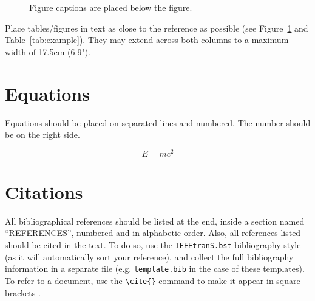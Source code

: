 \documentclass[twoside,10pt]{article}
\begin{document}
\begin{figure}[htbp]
\centerline{}
\caption{Figure captions are placed below the figure.}
\label{fig:example}
\end{figure}
Place tables/figures in text as close to the reference as possible
(see Figure~\ref{fig:example} and Table~\ref{tab:example}). They may extend
across both columns to a maximum width of 17.5cm (6.9").

\section{Equations}

Equations should be placed on separated lines and numbered.
The number should be on the right side.

\begin{equation}
E=mc^{2}
\end{equation}

\section{Citations}

All bibliographical references should be listed at the
end, inside a section named ``REFERENCES'', numbered
and in alphabetic order. Also, all
references listed should be cited in the text.
To do so, use the \texttt{IEEEtranS.bst} bibliography 
style (as it will automatically sort your reference), and 
collect the full bibliography information in a separate 
file (e.g. \texttt{template.bib} in the case of these 
templates).
To refer to a document, use the \verb+\cite{}+ command 
to make it appear in square brackets \cite{Place:2006,Lossius:2009}.
\end{document}
